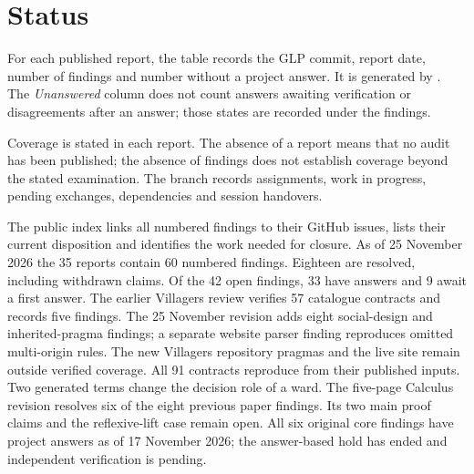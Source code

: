 \section{Status}

For each published report, the table records the GLP commit, report date, number of findings and number without a project answer. It is generated by . The \emph{Unanswered} column does not count answers awaiting verification or disagreements after an answer; those states are recorded under the findings.

Coverage is stated in each report. The absence of a report means that no audit has been published; the absence of findings does not establish coverage beyond the stated examination. The  branch records assignments, work in progress, pending exchanges, dependencies and session handovers.

The public  index links all numbered findings to their GitHub issues, lists their current disposition and identifies the work needed for closure. As of 25 November 2026 the 35 reports contain 60 numbered findings. Eighteen are resolved, including withdrawn claims. Of the 42 open findings, 33 have answers and 9 await a first answer. The earlier Villagers review verifies 57 catalogue contracts and records five findings. The 25 November revision adds eight social-design and inherited-pragma findings; a separate website parser finding reproduces omitted multi-origin rules. The new Villagers repository pragmas and the live site remain outside verified coverage. All 91 contracts reproduce from their published inputs. Two generated terms change the decision role of a ward. The five-page Calculus revision resolves six of the eight previous paper findings. Its two main proof claims and the reflexive-lift case remain open. All six original core findings have project answers as of 17 November 2026; the answer-based hold has ended and independent verification is pending.


